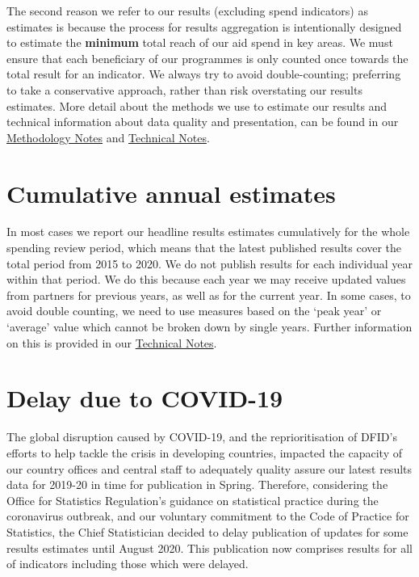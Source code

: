The second reason we refer to our results (excluding spend indicators) as estimates is because the process for results aggregation is intentionally designed to estimate the \textbf{minimum} total reach of our aid spend in key areas. %
We must ensure that each beneficiary of our programmes is only counted once towards the total result for an indicator. %
We always try to avoid double-counting; preferring to take a conservative approach, rather than risk overstating our results estimates. %
More detail about the methods we use to estimate our results and technical information about data quality and presentation, can be found in our \href{https://assets.publishing.service.gov.uk/government/uploads/system/uploads/attachment_data/file/911810/draft-dfid_results-estimates_methodology-notes_2015-2020.pdf}{Methodology Notes} and \href{https://assets.publishing.service.gov.uk/government/uploads/system/uploads/attachment_data/file/911809/dfid_results-estimates_technical-notes_2015-2020.pdf}{Technical Notes}. %

\section*{Cumulative annual estimates}
In most cases we report our headline results estimates cumulatively for the whole spending review period, which means that the latest published results cover the total period from 2015 to 2020. %
We do not publish results for each individual year within that period. %
We do this because each year we may receive updated values from partners for previous years, as well as for the current year. %
In some cases, to avoid double counting, we need to use measures based on the `peak year' or `average' value which cannot be broken down by single years. %
Further information on this is provided in our \href{https://assets.publishing.service.gov.uk/government/uploads/system/uploads/attachment_data/file/911809/dfid_results-estimates_technical-notes_2015-2020.pdf}{Technical Notes}.

\section*{Delay due to COVID-19}
The global disruption caused by COVID-19, and the reprioritisation of DFID's efforts to help tackle the crisis in developing countries, impacted the capacity of our country offices and central staff to adequately quality assure our latest results data for 2019-20 in time for publication in Spring. %
Therefore, considering the Office for Statistics Regulation's guidance on statistical practice during the coronavirus outbreak, and our voluntary commitment to the Code of Practice for Statistics, the Chief Statistician decided to delay publication of updates for some results estimates until August 2020. %
This publication now comprises results for all of indicators including those which were delayed. %


\newpage
